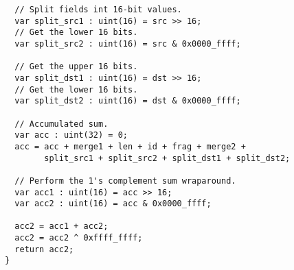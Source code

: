 \begin{lstlisting}
  // Split fields int 16-bit values.
  var split_src1 : uint(16) = src >> 16;
  // Get the lower 16 bits.
  var split_src2 : uint(16) = src & 0x0000_ffff;

  // Get the upper 16 bits.
  var split_dst1 : uint(16) = dst >> 16;
  // Get the lower 16 bits.
  var split_dst2 : uint(16) = dst & 0x0000_ffff;

  // Accumulated sum.
  var acc : uint(32) = 0;
  acc = acc + merge1 + len + id + frag + merge2 +
        split_src1 + split_src2 + split_dst1 + split_dst2;

  // Perform the 1's complement sum wraparound.
  var acc1 : uint(16) = acc >> 16;
  var acc2 : uint(16) = acc & 0x0000_ffff;

  acc2 = acc1 + acc2;
  acc2 = acc2 ^ 0xffff_ffff;
  return acc2;
}
\end{lstlisting}